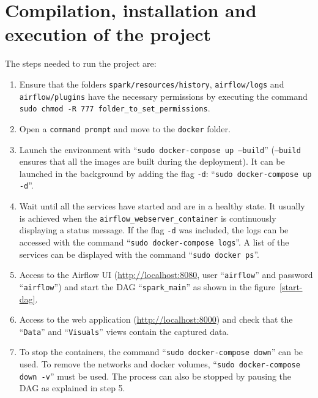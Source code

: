\section{Compilation, installation and execution of the project} \label{programmer_execute}
\nonzeroparskip The steps needed to run the project are:
\begin{enumerate}
	\item Ensure that the folders \texttt{spark/resources/history}, \texttt{airflow/logs} and \texttt{airflow/plugins} have the necessary permissions by executing the command \texttt{sudo chmod -R 777 folder\_to\_set\_permissions}. 
	\item Open a \texttt{command prompt} and move to the \texttt{docker} folder.
	\item Launch the environment with ``\texttt{sudo docker-compose up --build}'' (\texttt{--build} ensures that all the images are built during the deployment). It can be launched in the background by adding the flag \texttt{-d}: ``\texttt{sudo docker-compose up -d}''.
	\item Wait until all the services have started and are in a healthy state. It usually is achieved when the \texttt{airflow\_webserver\_container} is continuously displaying a status message. If the flag \texttt{-d} was included, the logs can be accessed with the command ``\texttt{sudo docker-compose logs}''. A list of the services can be displayed with the command ``\texttt{sudo docker ps}''.
	\item Access to the Airflow UI (\url{http://localhost:8080}, user ``\texttt{airflow}'' and password ``\texttt{airflow}'') and start the DAG ``\texttt{spark\_main}'' as shown in the figure~\ref{start-dag}.
	\item Access to the web application (\url{http://localhost:8000}) and check that the ``\texttt{Data}'' and ``\texttt{Visuals}'' views contain the captured data.
	\item To stop the containers, the command ``\texttt{sudo docker-compose down}'' can be used. To remove the networks and docker volumes, ``\texttt{sudo docker-compose down -v}'' must be used. The process can also be stopped by pausing the DAG as explained in step 5.
\end{enumerate}


